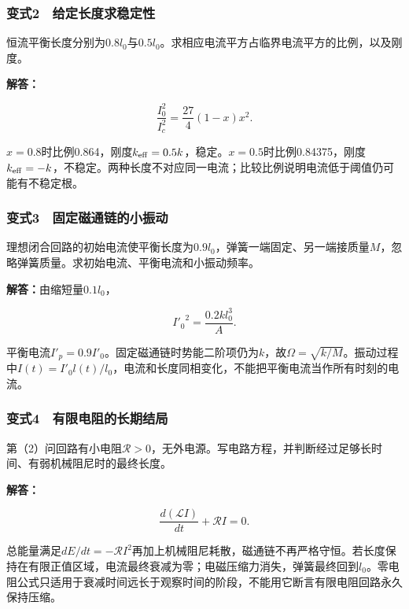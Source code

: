 \documentclass[12pt,a4paper,fontset=fandol]{ctexart}
\begin{document}
\subsubsection{变式2　给定长度求稳定性}\label{ux53d8ux5f0f2-ux7ed9ux5b9aux957fux5ea6ux6c42ux7a33ux5b9aux6027}

恒流平衡长度分别为\(0.8l_0\)与\(0.5l_0\)。求相应电流平方占临界电流平方的比例，以及刚度。

\textbf{解答：}

\[
\frac{I_0^2}{I_c^2}=\frac{27}{4}(1-x)x^2.
\]

\(x=0.8\)时比例0.864，刚度\(k_{\rm eff}=0.5k\)，稳定。\(x=0.5\)时比例0.84375，刚度\(k_{\rm eff}=-k\)，不稳定。两种长度不对应同一电流；比较比例说明电流低于阈值仍可能有不稳定根。

\subsubsection{变式3　固定磁通链的小振动}\label{ux53d8ux5f0f3-ux56faux5b9aux78c1ux901aux94feux7684ux5c0fux632fux52a8}

理想闭合回路的初始电流使平衡长度为\(0.9l_0\)，弹簧一端固定、另一端接质量\(M\)，忽略弹簧质量。求初始电流、平衡电流和小振动频率。

\textbf{解答：}由缩短量\(0.1l_0\)，

\[
{I'_0}^2=\frac{0.2kl_0^3}{A}.
\]

平衡电流\(I'_p=0.9I'_0\)。固定磁通链时势能二阶项仍为\(k\)，故\(\Omega=\sqrt{k/M}\)。振动过程中\(I(t)=I'_0l(t)/l_0\)，电流和长度同相变化，不能把平衡电流当作所有时刻的电流。

\subsubsection{变式4　有限电阻的长期结局}\label{ux53d8ux5f0f4-ux6709ux9650ux7535ux963bux7684ux957fux671fux7ed3ux5c40}

第（2）问回路有小电阻\(\mathcal R>0\)，无外电源。写电路方程，并判断经过足够长时间、有弱机械阻尼时的最终长度。

\textbf{解答：}

\[
\frac{d(\mathcal LI)}{dt}+\mathcal RI=0.
\]

总能量满足\(dE/dt=-\mathcal RI^2\)再加上机械阻尼耗散，磁通链不再严格守恒。若长度保持在有限正值区域，电流最终衰减为零；电磁压缩力消失，弹簧最终回到\(l_0\)。零电阻公式只适用于衰减时间远长于观察时间的阶段，不能用它断言有限电阻回路永久保持压缩。

\clearpage
\end{document}
